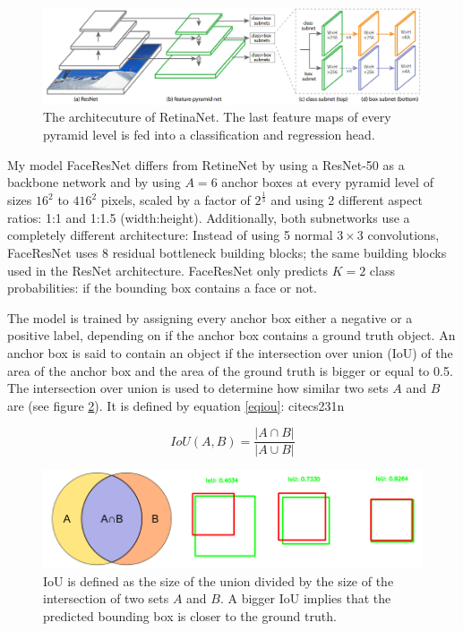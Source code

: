 \documentclass[a4paper,11pt,twoside]{article}
\begin{document}
\begin{figure}[h]
	\centering
  		\includegraphics[scale=0.38]{retinanet.png}
  	\caption{The architecuture of RetinaNet. The last feature maps of every pyramid level is fed into a classification and regression head. \cite{retinanet}}\label{figretinanet}
\end{figure}

My model FaceResNet differs from RetineNet by using a ResNet-50 as a backbone network and by using $A=6$ anchor boxes at every pyramid level of sizes $16^2$ to $416^2$ pixels, scaled by a factor of $2^\frac{1}{3}$ and using 2 different aspect ratios: 1:1 and 1:1.5 (width:height). Additionally, both subnetworks use a completely different architecture: Instead of using 5 normal $3 \times 3$ convolutions, FaceResNet uses 8 residual bottleneck building blocks; the same building blocks used in the ResNet architecture. FaceResNet only predicts $K=2$ class probabilities: if the bounding box contains a face or not.

The model is trained by assigning every anchor box either a negative or a positive label, depending on if the anchor box contains a ground truth object. An anchor box is said to contain an object if the intersection over union (IoU) of the area of the anchor box and the area of the ground truth is bigger or equal to 0.5. The intersection over union is used to determine how similar two sets $A$ and $B$ are (see figure \ref{figiou}). It is defined by equation \eqref{eqiou}: cite{cs231n} \cite{iou}

\begin{equation}\label{eqiou}
IoU(A, B)=\frac{|A \cap B|}{|A \cup B|}
\end{equation}

\begin{figure}[h]
	\centering
  		\includegraphics[scale=0.5]{iou.png}
  	\caption{IoU is defined as the size of the union divided by the size of the intersection of two sets $A$ and $B$. A bigger IoU implies that the predicted bounding box is closer to the ground truth. \cite{iou}} \label{figiou}
\end{figure}
\end{document}
